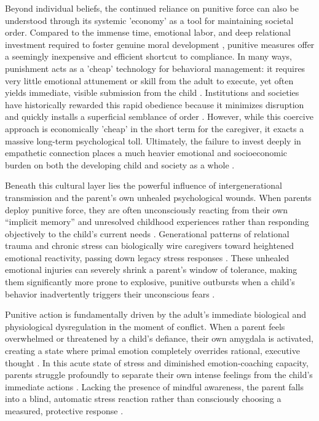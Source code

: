 Beyond individual beliefs, the continued reliance on punitive force can also be understood through its systemic 'economy' as a tool for maintaining societal order.
Compared to the immense time, emotional labor, and deep relational investment required to foster genuine moral development \citep{hoffman2000}, punitive measures offer a seemingly inexpensive and efficient shortcut to compliance.
In many ways, punishment acts as a 'cheap' technology for behavioral management: it requires very little emotional attunement or skill from the adult to execute, yet often yields immediate, visible submission from the child \citep{kohn2005}.
Institutions and societies have historically rewarded this rapid obedience because it minimizes disruption and quickly installs a superficial semblance of order \citep{gordon1970}.
However, while this coercive approach is economically 'cheap' in the short term for the caregiver, it exacts a massive long-term psychological toll.
Ultimately, the failure to invest deeply in empathetic connection places a much heavier emotional and socioeconomic burden on both the developing child and society as a whole \citep{heckman2006}.

Beneath this cultural layer lies the powerful influence of intergenerational transmission and the parent's own unhealed psychological wounds.
When parents deploy punitive force, they are often unconsciously reacting from their own ``implicit memory'' and unresolved childhood experiences rather than responding objectively to the child's current needs \citep{siegel2003}.
Generational patterns of relational trauma and chronic stress can biologically wire caregivers toward heightened emotional reactivity, passing down legacy stress responses \citep{meaney2001}.
These unhealed emotional injuries can severely shrink a parent's window of tolerance, making them significantly more prone to explosive, punitive outbursts when a child's behavior inadvertently triggers their unconscious fears \citep{vanderkolk2014}.

Punitive action is fundamentally driven by the adult's immediate biological and physiological dysregulation in the moment of conflict.
When a parent feels overwhelmed or threatened by a child's defiance, their own amygdala is activated, creating a state where primal emotion completely overrides rational, executive thought \citep{damasio1994}.
In this acute state of stress and diminished emotion-coaching capacity, parents struggle profoundly to separate their own intense feelings from the child's immediate actions \citep{gottman1997}.
Lacking the presence of mindful awareness, the parent falls into a blind, automatic stress reaction rather than consciously choosing a measured, protective response \citep{kabatzinn1990}.

